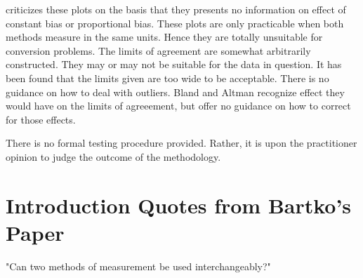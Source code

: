 \documentclass[12pt, a4paper]{report}
\theoremstyle{plain}
\theoremstyle{definition}
\theoremstyle{remark}
\begin{document}
\citet{ludbrook97,ludbrook02} criticizes these plots on the
basis that they presents no information on effect of constant bias
or proportional bias. These plots are only practicable when both
methods measure in the same units. Hence they are totally
unsuitable for conversion problems. The limits of agreement are
somewhat arbitrarily constructed. They may or may not be suitable
for the data in question. It has been found that the limits given
are too wide to be acceptable. There is no guidance on how to deal
with outliers. Bland and Altman recognize effect they would have
on the limits of agreeement, but offer no guidance on how to
correct for those effects.

There is no formal testing procedure provided. Rather, it is upon
the practitioner opinion to judge the outcome of the methodology.







%
%



%
%


\section*{Introduction Quotes from Bartko's Paper}
"Can two methods of measurement be used interchangeably?"
\end{document}
